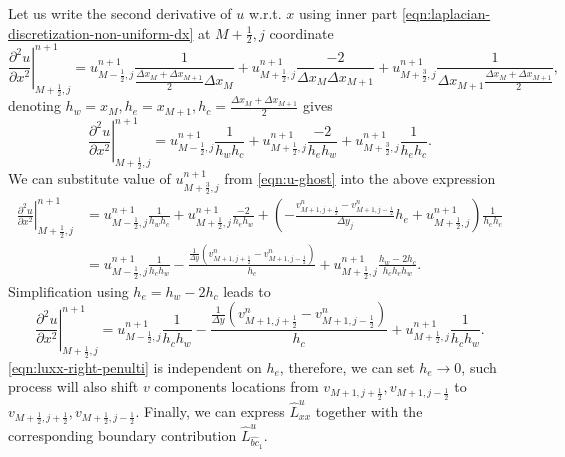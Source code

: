 \documentclass{article}
\numberwithin{equation}{section}
\begin{document}
Let us write the second derivative of $u$ w.r.t. $x$ using inner part \cref{eqn:laplacian-discretization-non-uniform-dx} at $M+\frac{1}{2},j$ coordinate 
\begin{equation}
	\left.\frac{\partial^2 u}{\partial x^2}\right|^{n+1}_{M+\frac{1}{2},j}=
		u^{n+1}_{M-\frac{1}{2},j}\frac{1}{\frac{\Delta x_M+\Delta x_{M+1}}{2} \Delta x_M}
		+u^{n+1}_{M+\frac{1}{2},j}\frac{-2}{\Delta x_M \Delta x_{M+1}}
		+u^{n+1}_{M+\frac{3}{2},j}\frac{1}{\Delta x_{M+1}\frac{\Delta x_M+\Delta x_{M+1}}{2}},
\end{equation}
denoting $h_w=x_M,h_e=x_{M+1},h_c=\frac{\Delta x_M+\Delta x_{M+1}}{2}$ gives
\begin{equation}
	\left.\frac{\partial^2 u}{\partial x^2}\right|^{n+1}_{M+\frac{1}{2},j}=
		u^{n+1}_{M-\frac{1}{2},j}\frac{1}{h_w h_c}
		+u^{n+1}_{M+\frac{1}{2},j}\frac{-2}{h_e h_w}
		+u^{n+1}_{M+\frac{3}{2},j}\frac{1}{h_e h_c}.
\end{equation}
We can substitute value of $u^{n+1}_{M+\frac{3}{2},j}$ from \cref{eqn:u-ghost} into the above expression
\begin{align}
	\left.\frac{\partial^2 u}{\partial x^2}\right|^{n+1}_{M+\frac{1}{2},j}&=
		u^{n+1}_{M-\frac{1}{2},j}\frac{1}{h_w h_c}
		+u^{n+1}_{M+\frac{1}{2},j}\frac{-2}{h_e h_w}
		+\left( -\frac{v^n_{M+1,j+\frac{1}{2}}-v^n_{M+1,j-\frac{1}{2}}}{\Delta y_j} h_e+u^{n+1}_{M+\frac{1}{2},j}\right)\frac{1}{h_e h_c}\\
		&=u^{n+1}_{M-\frac{1}{2},j}\frac{1}{h_c h_w}
		-\frac{\frac{1}{\Delta y}\left( v^n_{M+1,j+\frac{1}{2}}-v^n_{M+1,j-\frac{1}{2}} \right)}{h_c}
		+u^{n+1}_{M+\frac{1}{2},j}\frac{h_w-2h_c}{h_c h_e h_w}.
\end{align}
Simplification using $h_e=h_w-2h_c$ leads to 
\begin{equation}\label{eqn:luxx-right-penulti}
	\left.\frac{\partial^2 u}{\partial x^2}\right|^{n+1}_{M+\frac{1}{2},j}=
	u^{n+1}_{M-\frac{1}{2},j}\frac{1}{h_c h_w}
	-\frac{\frac{1}{\Delta y}\left( v^n_{M+1,j+\frac{1}{2}}-v^n_{M+1,j-\frac{1}{2}} \right)}{h_c}
	+u^{n+1}_{M+\frac{1}{2},j}\frac{1}{h_c h_w}.
\end{equation}
\cref{eqn:luxx-right-penulti} is independent on $h_e$, therefore, we can set $h_e\to 0$, such process will also shift $v$ components locations from $v_{M+1,j+\frac{1}{2}},v_{M+1,j-\frac{1}{2}}$ to $v_{M+\frac{1}{2},j+\frac{1}{2}},v_{M+\frac{1}{2},j-\frac{1}{2}}$. Finally, we can express $\hat{L}^u_{xx}$ together with the corresponding boundary contribution $\hat{L}^u_{\hat{bc}_1}$.
\end{document}
